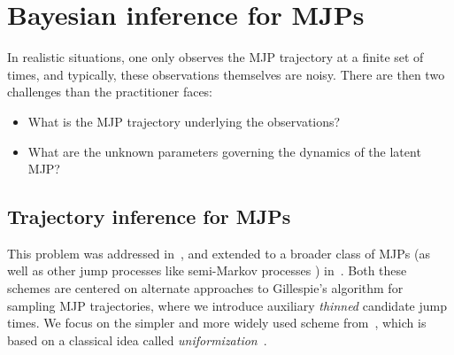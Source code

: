
\section{Bayesian inference for MJPs}
In realistic situations, one only observes the MJP trajectory at
a finite set of times, and typically, these observations themselves
are noisy. There are then two challenges than the practitioner faces:
\begin{itemize}
  \item What is the MJP trajectory underlying the observations?
  \item What are the unknown parameters governing the dynamics of the 
    latent MJP?
\end{itemize}

\subsection{Trajectory inference for MJPs}
This problem was addressed in~\cite{RaoTeh13}, and extended to a broader 
class of MJPs (as well as other jump processes like semi-Markov processes
) in~\cite{RaoTeh12}. Both these schemes are centered on alternate
approaches to Gillespie's algorithm for sampling MJP trajectories, where we
introduce auxiliary {\em thinned} candidate jump times. 
We focus on the simpler and more widely used scheme from~\cite{RaoTeh13}, 
which is based on a classical idea called {\em uniformization}~\cite{Jen1953}. 

